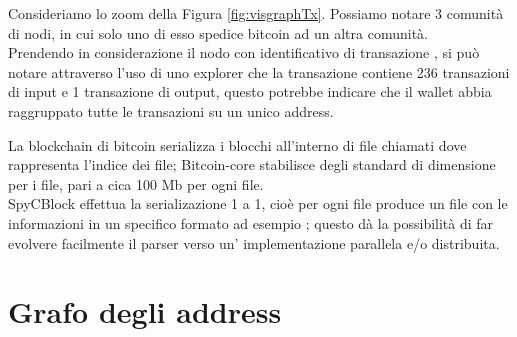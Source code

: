 \begin{example}
Consideriamo lo zoom  della Figura \ref{fig:visgraphTx}. Possiamo notare 3 comunità di nodi, in cui solo uno di esso spedice bitcoin ad un altra comunità.\\
  Prendendo in considerazione il nodo con  identificativo di transazione , si può notare attraverso l'uso di uno explorer che la transazione contiene 236 transazioni di input e 1 transazione di output, questo potrebbe indicare che il wallet abbia raggruppato tutte le transazioni su un unico address.
\end{example}

La blockchain di bitcoin serializza i blocchi all'interno di file chiamati  dove  rappresenta l'indice dei file; Bitcoin-core stabilisce degli standard di dimensione per i file, pari a cica 100 Mb per ogni file.\\
SpyCBlock effettua la serializazione 1 a 1, cioè per ogni file  produce un file con le informazioni in un specifico formato ad esempio ; questo dà la possibilità di far evolvere facilmente il parser verso un' implementazione parallela e/o distribuita.

\section{Grafo degli address} \label{sec:solGraphAddress}

